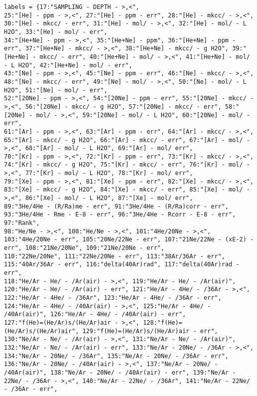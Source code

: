 \begin{verbatim}
labels = {17:"SAMPLING - DEPTH - >,<",
25:"[He] - ppm - >,<", 27:"[He] - ppm - err", 28:"[He] - mkcc/ - >,<", 30:"[He] - mkcc/ - err", 31:"[He] - mol/ - >,<", 32:"[He] - mol/ - L H2O", 33:"[He] - mol/ - err",
34:"[He+Ne] - ppm - >,<", 35:"[He+Ne] - ppm", 36:"[He+Ne] - ppm - err", 37:"[He+Ne] - mkcc/ - >,<", 38:"[He+Ne] - mkcc/ - g H2O", 39:"[He+Ne] - mkcc/ - err", 40:"[He+Ne] - mol/ - >,<", 41:"[He+Ne] - mol/ - L H2O", 42:"[He+Ne] - mol/ - err",
43:"[Ne] - ppm - >,<", 45:"[Ne] - ppm - err", 46:"[Ne] - mkcc/ - >,<", 48:"[Ne] - mkcc/ - err", 49:"[Ne] - mol/ - >,<", 50:"[Ne] - mol/ - L H2O", 51:"[Ne] - mol/ - err",
52:"[20Ne] - ppm - >,<", 54:"[20Ne] - ppm - err", 55:"[20Ne] - mkcc/ - >,<", 56:"[20Ne] - mkcc/ - g H2O", 57:"[20Ne] - mkcc/ - err", 58:"[20Ne] - mol/ - >,<", 59:"[20Ne] - mol/ - L H2O", 60:"[20Ne] - mol/ - err",
61:"[Ar] - ppm - >,<", 63:"[Ar] - ppm - err", 64:"[Ar] - mkcc/ - >,<", 65:"[Ar] - mkcc/ - g H2O", 66:"[Ar] - mkcc/ - err", 67:"[Ar] - mol/ - >,<", 68:"[Ar] - mol/ - L H2O", 69:"[Ar] - mol/ err",
70:"[Kr] - ppm - >,<", 72:"[Kr] - ppm - err", 73:"[Kr] - mkcc/ - >,<", 74:"[Kr] - mkcc/ - g H2O", 75:"[Kr] - mkcc/ - err", 76:"[Kr] - mol/ - >,<", 77:"[Kr] - mol/ - L H2O", 78:"[Kr] - mol/ err",
79:"[Xe] - ppm - >,<", 81:"[Xe] - ppm - err", 82:"[Xe] - mkcc/ - >,<", 83:"[Xe] - mkcc/ - g H2O", 84:"[Xe] - mkcc/ - err", 85:"[Xe] - mol/ - >,<", 86:"[Xe] - mol/ - L H2O", 87:"[Xe] - mol/ err",
89:"3He/4He - (R/Ra)me - err", 91:"3He/4He - (R/Ra)corr - err", 93:"3He/4He - Rme - E-8 - err", 96:"3He/4He - Rcorr - E-8 - err", 97:"Rank",
98:"He/Ne - >,<", 100:"He/Ne - >,<", 101:"4He/20Ne - >,<", 103:"4He/20Ne - err", 105:"20Ne/22Ne - err", 107:"21Ne/22Ne - (xE-2) - err", 108:"21Ne/20Ne", 109:"21Ne/20Ne - err",
110:"22Ne/20Ne", 111:"22Ne/20Ne - err", 113:"38Ar/36Ar - err", 115:"40Ar/36Ar - err", 116:"delta(40Ar)rad", 117:"delta(40Ar)rad - err",
118:"He/Ar - He/ - /Ar(air) - >,<", 119:"He/Ar - He/ - /Ar(air)", 120:"He/Ar - He/ - /Ar(air) - err", 121:"He/Ar - 4He/ - /36Ar - >,<", 122:"He/Ar - 4He/ - /36Ar", 123:"He/Ar - 4He/ - /36Ar - err",
124:"He/Ar - 4He/ - /40Ar(air) - >,<", 125:"He/Ar - 4He/ - /40Ar(air)", 126:"He/Ar - 4He/ - /40Ar(air) - err",
127:"f(He)=(He/Ar)s/(He/Ar)air - >,<", 128:"f(He)=(He/Ar)s/(He/Ar)air", 129:"f(He)=(He/Ar)s/(He/Ar)air - err",
130:"Ne/Ar - Ne/ - /Ar(air) - >,<", 131:"Ne/Ar - Ne/ - /Ar(air)", 132:"Ne/Ar - Ne/ - /Ar(air) - err", 133:"Ne/Ar - 20Ne/ - /36Ar - >,<", 134:"Ne/Ar - 20Ne/ - /36Ar", 135:"Ne/Ar - 20Ne/ - /36Ar - err",
136:"Ne/Ar - 20Ne/ - /40Ar(air) - >,<", 137:"Ne/Ar - 20Ne/ - /40Ar(air)", 138:"Ne/Ar - 20Ne/ - /40Ar(air) - err", 139:"Ne/Ar - 22Ne/ - /36Ar - >,<", 140:"Ne/Ar - 22Ne/ - /36Ar", 141:"Ne/Ar - 22Ne/ - /36Ar - err",

\end{verbatim}
